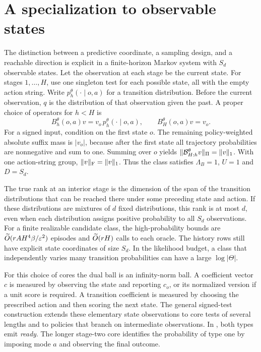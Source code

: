 \section{A specialization to observable states}\label{sec:specialcase}
The distinction between a predictive coordinate, a sampling design, and a reachable direction is explicit in a finite-horizon Markov system with $S_d$ observable states. Let the observation at each stage be the current state. For stages $1,\ldots,H$, use one singleton test for each possible state, all with the empty action string. Write $p^\theta_h(\cdot\mid o,a)$ for a transition distribution. Before the current observation, $q$ is the distribution of that observation given the past. A proper choice of operators for $h<H$ is
\[
 B_h^\theta(o,a)v = v_o\,p^\theta_h(\cdot\mid o,a),
 \qquad B_H^\theta(o,a)v=v_o .
\]
For a signed input, condition on the first state $o$. The remaining policy-weighted absolute suffix mass is $|v_o|$, because after the first state all trajectory probabilities are nonnegative and sum to one. Summing over $o$ yields $\lVert \mathcal B^\theta_{H:h}v\rVert_{\Pi}=\|v\|_1$. With one action-string group, $\lVert v\rVert_{\mathrm F}=\|v\|_1$. Thus the class satisfies $\Lambda_B=1$, $U=1$ and $D=S_d$.

The true rank at an interior stage is the dimension of the span of the transition distributions that can be reached there under some preceding state and action. If these distributions are mixtures of $d$ fixed distributions, this rank is at most $d$, even when each distribution assigns positive probability to all $S_d$ observations. For a finite realizable candidate class, the high-probability bounds are $\widetilde O(rAH^4\beta/\varepsilon^2)$ episodes and $\widetilde O(rH)$ calls to each oracle. The history rows still have explicit state coordinates of size $S_d$. In the likelihood budget, a class that independently varies many transition probabilities can have a large $\log|\Theta|$.

For this choice of cores the dual ball is an infinity-norm ball. A coefficient vector $c$ is measured by observing the state and reporting $c_o$, or its normalized version if a unit score is required. A transition coefficient is measured by choosing the prescribed action and then scoring the next state. The general signed-test construction extends these elementary state observations to core tests of several lengths and to policies that branch on intermediate observations. In , both types emit \emph{ready}. The longer stage-two core identifies the probability of type one by imposing mode $a$ and observing the final outcome.
